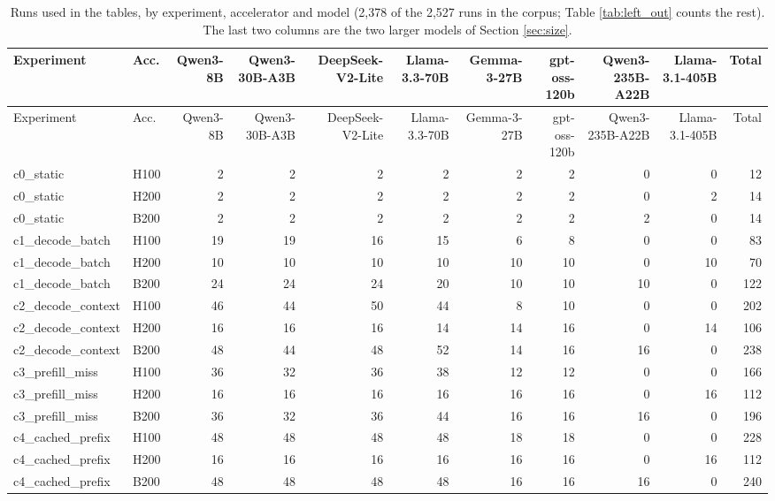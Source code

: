 \begin{landscape}
\begingroup
\scriptsize
\setlength{\tabcolsep}{3pt}
\begin{longtable}{llrrrrrrrrr}
\caption{Runs used in the tables, by experiment, accelerator and model (2,378 of the 2,527 runs in the corpus; Table \ref{tab:left_out} counts the rest). The last two columns are the two larger models of Section \ref{sec:size}.}\label{tab:corpus}\\
\toprule
Experiment & Acc. & Qwen3-8B & Qwen3-30B-A3B & DeepSeek-V2-Lite & Llama-3.3-70B & Gemma-3-27B & gpt-oss-120b & Qwen3-235B-A22B & Llama-3.1-405B & Total \\
\midrule
\endfirsthead
\toprule
Experiment & Acc. & Qwen3-8B & Qwen3-30B-A3B & DeepSeek-V2-Lite & Llama-3.3-70B & Gemma-3-27B & gpt-oss-120b & Qwen3-235B-A22B & Llama-3.1-405B & Total \\
\midrule
\endhead
\bottomrule
\endfoot
c0\_static & H100 & 2 & 2 & 2 & 2 & 2 & 2 & 0 & 0 & 12 \\
c0\_static & H200 & 2 & 2 & 2 & 2 & 2 & 2 & 0 & 2 & 14 \\
c0\_static & B200 & 2 & 2 & 2 & 2 & 2 & 2 & 2 & 0 & 14 \\
c1\_decode\_batch & H100 & 19 & 19 & 16 & 15 & 6 & 8 & 0 & 0 & 83 \\
c1\_decode\_batch & H200 & 10 & 10 & 10 & 10 & 10 & 10 & 0 & 10 & 70 \\
c1\_decode\_batch & B200 & 24 & 24 & 24 & 20 & 10 & 10 & 10 & 0 & 122 \\
c2\_decode\_context & H100 & 46 & 44 & 50 & 44 & 8 & 10 & 0 & 0 & 202 \\
c2\_decode\_context & H200 & 16 & 16 & 16 & 14 & 14 & 16 & 0 & 14 & 106 \\
c2\_decode\_context & B200 & 48 & 44 & 48 & 52 & 14 & 16 & 16 & 0 & 238 \\
c3\_prefill\_miss & H100 & 36 & 32 & 36 & 38 & 12 & 12 & 0 & 0 & 166 \\
c3\_prefill\_miss & H200 & 16 & 16 & 16 & 16 & 16 & 16 & 0 & 16 & 112 \\
c3\_prefill\_miss & B200 & 36 & 32 & 36 & 44 & 16 & 16 & 16 & 0 & 196 \\
c4\_cached\_prefix & H100 & 48 & 48 & 48 & 48 & 18 & 18 & 0 & 0 & 228 \\
c4\_cached\_prefix & H200 & 16 & 16 & 16 & 16 & 16 & 16 & 0 & 16 & 112 \\
c4\_cached\_prefix & B200 & 48 & 48 & 48 & 48 & 16 & 16 & 16 & 0 & 240 \\

\end{longtable}
\end{landscape}
